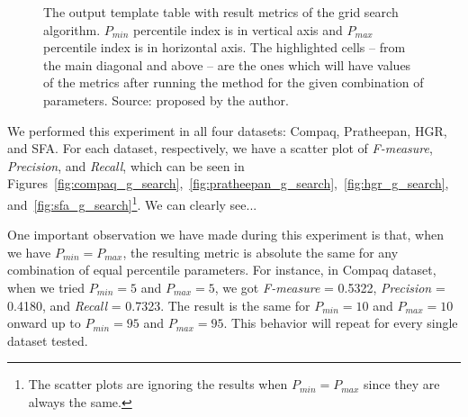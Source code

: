\begin{figure}[ht]
    \centering

    \caption[The output template table with result metrics of the grid search algorithm]{The output template table with result metrics of the grid search algorithm. $P_{min}$ percentile index is in vertical axis and $P_{max}$ percentile index is in horizontal axis. The highlighted cells -- from the main diagonal and above -- are the ones which will have values of the metrics after running the method for the given combination of parameters. Source: proposed by the author.}
    \label{fig:gs_table_output}
\end{figure}

We performed this experiment in all four datasets: Compaq, Pratheepan, HGR, and SFA. For each dataset, respectively, we have a scatter plot of \emph{F-measure}, \emph{Precision}, and \emph{Recall}, which can be seen in Figures~\ref{fig:compaq_g_search},~\ref{fig:pratheepan_g_search},~\ref{fig:hgr_g_search}, and~\ref{fig:sfa_g_search}\footnote{The scatter plots are ignoring the results when $P_{min} = P_{max}$ since they are always the same.}. We can clearly see...

One important observation we have made during this experiment is that, when we have $P_{min} = P_{max}$, the resulting metric is absolute the same for any combination of equal percentile parameters. For instance, in Compaq dataset, when we tried $P_{min} = 5$ and $P_{max} = 5$, we got \emph{F-measure} = 0.5322, \emph{Precision} = 0.4180, and \emph{Recall} = 0.7323. The result is the same for $P_{min} = 10$ and $P_{max} = 10$ onward up to $P_{min} = 95$ and $P_{max} = 95$. This behavior will repeat for every single dataset tested.

